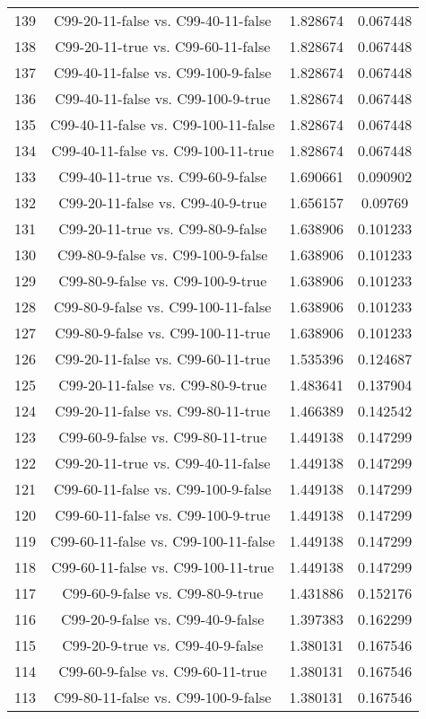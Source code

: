 \documentclass[a4paper,10pt]{article}
\begin{document}
\begin{landscape}
\begin{table}[!htp]
\begin{tabular}{cccc}
139&C99-20-11-false vs. C99-40-11-false&1.828674&0.067448\\
138&C99-20-11-true vs. C99-60-11-false&1.828674&0.067448\\
137&C99-40-11-false vs. C99-100-9-false&1.828674&0.067448\\
136&C99-40-11-false vs. C99-100-9-true&1.828674&0.067448\\
135&C99-40-11-false vs. C99-100-11-false&1.828674&0.067448\\
134&C99-40-11-false vs. C99-100-11-true&1.828674&0.067448\\
133&C99-40-11-true vs. C99-60-9-false&1.690661&0.090902\\
132&C99-20-11-false vs. C99-40-9-true&1.656157&0.09769\\
131&C99-20-11-true vs. C99-80-9-false&1.638906&0.101233\\
130&C99-80-9-false vs. C99-100-9-false&1.638906&0.101233\\
129&C99-80-9-false vs. C99-100-9-true&1.638906&0.101233\\
128&C99-80-9-false vs. C99-100-11-false&1.638906&0.101233\\
127&C99-80-9-false vs. C99-100-11-true&1.638906&0.101233\\
126&C99-20-11-false vs. C99-60-11-true&1.535396&0.124687\\
125&C99-20-11-false vs. C99-80-9-true&1.483641&0.137904\\
124&C99-20-11-false vs. C99-80-11-true&1.466389&0.142542\\
123&C99-60-9-false vs. C99-80-11-true&1.449138&0.147299\\
122&C99-20-11-true vs. C99-40-11-false&1.449138&0.147299\\
121&C99-60-11-false vs. C99-100-9-false&1.449138&0.147299\\
120&C99-60-11-false vs. C99-100-9-true&1.449138&0.147299\\
119&C99-60-11-false vs. C99-100-11-false&1.449138&0.147299\\
118&C99-60-11-false vs. C99-100-11-true&1.449138&0.147299\\
117&C99-60-9-false vs. C99-80-9-true&1.431886&0.152176\\
116&C99-20-9-false vs. C99-40-9-false&1.397383&0.162299\\
115&C99-20-9-true vs. C99-40-9-false&1.380131&0.167546\\
114&C99-60-9-false vs. C99-60-11-true&1.380131&0.167546\\
113&C99-80-11-false vs. C99-100-9-false&1.380131&0.167546\\

\end{tabular}
\end{table}
\end{landscape}
\end{document}
